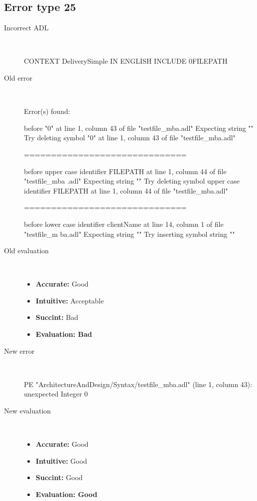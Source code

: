\subsection{Error type 25}
  \begin{description}
  \item[Incorrect ADL]~\\
\begin{adl}
CONTEXT DeliverySimple IN ENGLISH INCLUDE 0FILEPATH\end{adl}
  \item[Old error]~\\
\begin{haskell}
Error(s) found:

before "0" at line 1, column 43 of file "testfile_mba.adl"
Expecting string ""
Try deleting symbol "0" at line 1, column 43 of file "testfile_mba.adl"

==============================

before upper case identifier FILEPATH at line 1, column 44 of file "testfile_mba
.adl"
Expecting string ""
Try deleting symbol upper case identifier FILEPATH at line 1, column 44 of file
"testfile_mba.adl"

==============================

before lower case identifier clientName at line 14, column 1 of file "testfile_m
ba.adl"
Expecting string ""
Try inserting symbol string ""
\end{haskell}
  \item[Old evaluation]~\\
    \begin{itemize}
    \item \textbf{Accurate:} Good
    \item \textbf{Intuitive:} Acceptable
    \item \textbf{Succint:} Bad
    \item \textbf{Evaluation: Bad}
    \end{itemize}
  \item[New error]~\\
\begin{haskell}
PE "ArchitectureAndDesign/Syntax/testfile_mba.adl" (line 1, column 43):
unexpected Integer 0\end{haskell}
  \item[New evaluation]~\\
    \begin{itemize}
    \item \textbf{Accurate:} Good
    \item \textbf{Intuitive:} Good
    \item \textbf{Succint:} Good
    \item \textbf{Evaluation: Good
}
    \end{itemize}
  \end{description}

